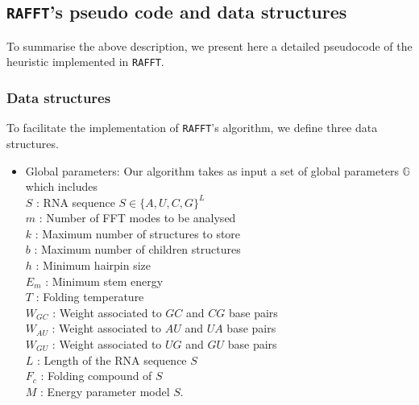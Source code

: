 \subsection{\texttt{RAFFT}'s pseudo code and data structures}
To summarise the above description, we present here a detailed pseudocode of the heuristic implemented in \texttt{RAFFT}. 
\subsubsection{Data structures}
To facilitate the implementation of \texttt{RAFFT}'s algorithm, we define three data structures. 
\begin{itemize}
	\item Global parameters: Our algorithm takes as input a set of global parameters $\mathbb{G}$ which includes \\
	\hspace*{0.2cm} $S$ : RNA sequence $S \in \{A,U,C,G\}^L$\\
	\hspace*{0.2cm} $m$ : Number of FFT modes to be analysed\\
	\hspace*{0.2cm} $k$ : Maximum number of structures to store\\
	\hspace*{0.2cm} $b$ : Maximum number of children structures\\
	\hspace*{0.2cm} $h$ : Minimum hairpin size\\
	\hspace*{0.2cm} $E_m$ : Minimum stem energy\\
	\hspace*{0.2cm} $T$ : Folding temperature\\
	\hspace*{0.2cm} $W_{GC}$ : Weight associated to $GC$ and $CG$ base pairs\\
	\hspace*{0.2cm} $W_{AU}$ : Weight associated to $AU$ and $UA$ base pairs\\
	\hspace*{0.2cm} $W_{GU}$ : Weight associated to $UG$ and $GU$ base pairs\\
	\hspace*{0.2cm} $L$ : Length of the RNA sequence $S$\\
	\hspace*{0.2cm} $F_c$ : Folding compound of $S$\\
	\hspace*{0.2cm} $M$ : Energy parameter model $S$. 
	

\end{itemize}
